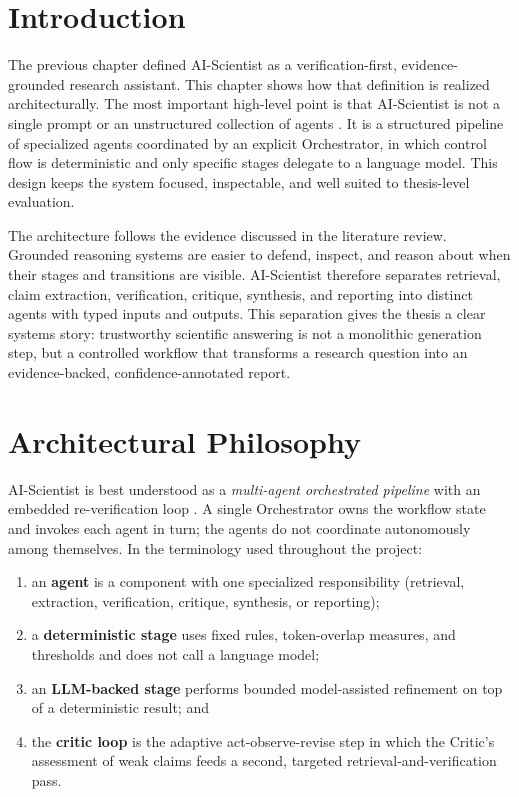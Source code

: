\section{Introduction }

The previous chapter defined AI-Scientist as a verification-first, evidence-grounded research assistant. This
chapter shows how that definition is realized architecturally. The most important high-level point is that
AI-Scientist is not a single prompt or an unstructured collection of agents \cite{wu2023autogen,li2023camel,du2023debate}. It is a structured pipeline of
specialized agents coordinated by an explicit Orchestrator, in which control flow is deterministic and only
specific stages delegate to a language model. This design keeps the system focused, inspectable, and well suited
to thesis-level evaluation.

The architecture follows the evidence discussed in the literature review. Grounded reasoning systems are easier to
defend, inspect, and reason about when their stages and transitions are visible. AI-Scientist therefore separates
retrieval, claim extraction, verification, critique, synthesis, and reporting into distinct agents with typed
inputs and outputs. This separation gives the thesis a clear systems story: trustworthy scientific answering is not
a monolithic generation step, but a controlled workflow that transforms a research question into an
evidence-backed, confidence-annotated report.

\section{Architectural Philosophy }

AI-Scientist is best understood as a \emph{multi-agent orchestrated pipeline} with an embedded re-verification
loop \cite{yao2023treeofthoughts,shinn2023reflexion,asai2024selfrag}. A single Orchestrator owns the workflow state and invokes each agent in turn; the agents do not coordinate
autonomously among themselves. In the terminology used throughout the project:

\begin{enumerate}
\item an \textbf{agent} is a component with one specialized responsibility (retrieval, extraction, verification,
critique, synthesis, or reporting);
\item a \textbf{deterministic stage} uses fixed rules, token-overlap measures, and thresholds and does not call a
language model;
\item an \textbf{LLM-backed stage} performs bounded model-assisted refinement on top of a deterministic result;
and
\item the \textbf{critic loop} is the adaptive act-observe-revise step in which the Critic's assessment of weak
claims feeds a second, targeted retrieval-and-verification pass.
\end{enumerate}

